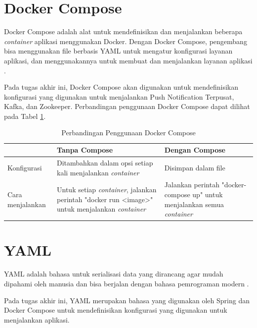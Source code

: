 \section{Docker Compose}
\par Docker Compose adalah alat untuk mendefinisikan dan menjalankan beberapa \textit{container} aplikasi menggunakan Docker. Dengan Docker Compose, pengembang bisa menggunakan file berbasis YAML untuk mengatur konfigurasi layanan aplikasi, dan menggunakannya untuk membuat dan menjalankan layanan aplikasi \cite{docker-compose-online}.
\par Pada tugas akhir ini, Docker Compose akan digunakan untuk mendefinisikan konfigurasi yang digunakan untuk menjalankan Push Notification Terpusat, Kafka, dan Zookeeper. Perbandingan penggunaan Docker Compose dapat dilihat pada Tabel \ref{t:perbandingan_docker_compose}.
\begin{longtable}{|p{2cm}|p{3.5cm}|p{3.5cm}|}
	\caption{Perbandingan Penggunaan Docker Compose} \label{t:perbandingan_docker_compose} \\ \hline
	\rowcolor{lightgray} & Tanpa Compose & Dengan Compose \\ \hline
	Konfigurasi & Ditambahkan dalam opsi setiap kali menjalankan \textit{container} & Disimpan dalam file \\ \hline
	Cara menjalankan & Untuk setiap \textit{container}, jalankan perintah "docker run <image>" untuk menjalankan \textit{container} & Jalankan perintah "docker-compose up" untuk menjalankan semua \textit{container} \\ \hline
\end{longtable}

\section{YAML}
\par YAML adalah bahasa untuk serialisasi data yang dirancang agar mudah dipahami oleh manusia dan bisa berjalan dengan bahasa pemrograman modern \cite{yaml-online}.
\par Pada tugas akhir ini, YAML merupakan bahasa yang digunakan oleh Spring dan Docker Compose untuk mendefinisikan konfigurasi yang digunakan untuk menjalankan aplikasi.
